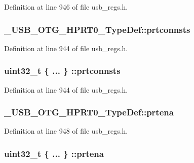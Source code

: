Definition at line 946 of file usb\-\_\-regs.\-h.

\hypertarget{group___u_s_b___o_t_g___d_r_i_v_e_r_ga80c85f29776c859b982bffa2d57a61c0}{
\subsubsection[{prtconnsts}]{ \-\_\-\-U\-S\-B\-\_\-\-O\-T\-G\-\_\-\-H\-P\-R\-T0\-\_\-\-Type\-Def\-::prtconnsts}}\label{group___u_s_b___o_t_g___d_r_i_v_e_r_ga80c85f29776c859b982bffa2d57a61c0}


Definition at line 944 of file usb\-\_\-regs.\-h.

\hypertarget{group___u_s_b___o_t_g___d_r_i_v_e_r_ga2e6b6bfcefcdb9f75cb68bf2ee323ad1}{
\subsubsection[{prtconnsts}]{\setlength{\rightskip}{0pt plus 5cm}uint32\-\_\-t \{ ... \} \-::prtconnsts}}\label{group___u_s_b___o_t_g___d_r_i_v_e_r_ga2e6b6bfcefcdb9f75cb68bf2ee323ad1}


Definition at line 944 of file usb\-\_\-regs.\-h.

\hypertarget{group___u_s_b___o_t_g___d_r_i_v_e_r_ga36818f9fe8a4bbdeb764b5426ea40a52}{
\subsubsection[{prtena}]{ \-\_\-\-U\-S\-B\-\_\-\-O\-T\-G\-\_\-\-H\-P\-R\-T0\-\_\-\-Type\-Def\-::prtena}}\label{group___u_s_b___o_t_g___d_r_i_v_e_r_ga36818f9fe8a4bbdeb764b5426ea40a52}


Definition at line 948 of file usb\-\_\-regs.\-h.

\hypertarget{group___u_s_b___o_t_g___d_r_i_v_e_r_gade4ffb73cbba0158489663fc5c0e04e6}{
\subsubsection[{prtena}]{\setlength{\rightskip}{0pt plus 5cm}uint32\-\_\-t \{ ... \} \-::prtena}}\label{group___u_s_b___o_t_g___d_r_i_v_e_r_gade4ffb73cbba0158489663fc5c0e04e6}



